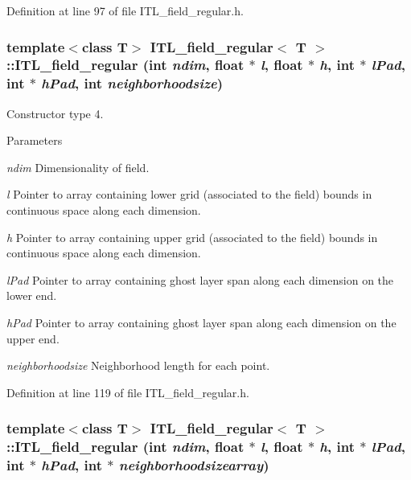 Definition at line 97 of file ITL\_\-field\_\-regular.h.

\hypertarget{classITL__field__regular_a0f0e50f05a38f12596faf9a6fc6a8674}{
\subsubsection[{ITL\_\-field\_\-regular}]{\setlength{\rightskip}{0pt plus 5cm}template$<$class T$>$ {\bf ITL\_\-field\_\-regular}$<$ T $>$::{\bf ITL\_\-field\_\-regular} (int {\em ndim}, \/  float $\ast$ {\em l}, \/  float $\ast$ {\em h}, \/  int $\ast$ {\em lPad}, \/  int $\ast$ {\em hPad}, \/  int {\em neighborhoodsize})}}
\label{classITL__field__regular_a0f0e50f05a38f12596faf9a6fc6a8674}


Constructor type 4. 


\begin{DoxyParams}{Parameters}
\item[{\em ndim}]Dimensionality of field. \item[{\em l}]Pointer to array containing lower grid (associated to the field) bounds in continuous space along each dimension. \item[{\em h}]Pointer to array containing upper grid (associated to the field) bounds in continuous space along each dimension. \item[{\em lPad}]Pointer to array containing ghost layer span along each dimension on the lower end. \item[{\em hPad}]Pointer to array containing ghost layer span along each dimension on the upper end. \item[{\em neighborhoodsize}]Neighborhood length for each point. \end{DoxyParams}


Definition at line 119 of file ITL\_\-field\_\-regular.h.

\hypertarget{classITL__field__regular_aeabd017636d10eababa418b8cfa8765c}{
\subsubsection[{ITL\_\-field\_\-regular}]{\setlength{\rightskip}{0pt plus 5cm}template$<$class T$>$ {\bf ITL\_\-field\_\-regular}$<$ T $>$::{\bf ITL\_\-field\_\-regular} (int {\em ndim}, \/  float $\ast$ {\em l}, \/  float $\ast$ {\em h}, \/  int $\ast$ {\em lPad}, \/  int $\ast$ {\em hPad}, \/  int $\ast$ {\em neighborhoodsizearray})}}
\label{classITL__field__regular_aeabd017636d10eababa418b8cfa8765c}


